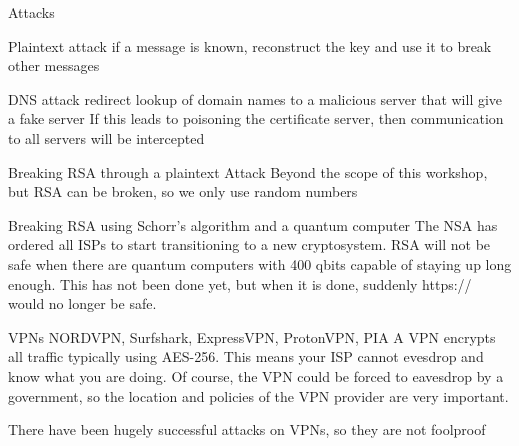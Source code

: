 Attacks

Plaintext attack
    if a message is known, reconstruct the key and use it to break other messages

DNS attack
    redirect lookup of domain names to a malicious server that will give a fake server
    If this leads to poisoning the certificate server, then communication to all servers will be intercepted

Breaking RSA through a plaintext Attack
    Beyond the scope of this workshop, but RSA can be broken, so we only use random numbers

Breaking RSA using Schorr's algorithm and a quantum computer
    The NSA has ordered all ISPs to start transitioning to a new cryptosystem.
    RSA will not be safe when there are quantum computers with 400 qbits capable of staying up long enough.
    This has not been done yet, but when it is done, suddenly https:// would no longer be safe.

VPNs
    NORDVPN, Surfshark, ExpressVPN, ProtonVPN, PIA 
    A VPN encrypts all traffic typically using AES-256.
    This means your ISP cannot evesdrop and know what you are doing.
    Of course, the VPN could be forced to eavesdrop by a government, so the location and policies of the VPN provider
    are very important.

    There have been hugely successful attacks on VPNs, so they are not foolproof


